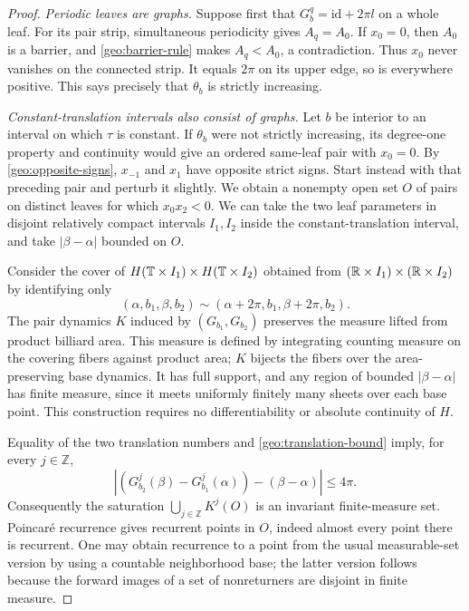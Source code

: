 \begin{proof}
\emph{Periodic leaves are graphs.}
Suppose first that $G_b^q=\mathrm{id}+2\pi l$ on a whole leaf.
For its pair strip, simultaneous periodicity gives $A_q=A_0$.
If $x_0=0$, then $A_0$ is a barrier, and
\eqref{geo:barrier-rule} makes $A_q<A_0$, a contradiction.
Thus $x_0$ never vanishes on the connected strip.  It equals $2\pi$
on its upper edge, so is everywhere positive.  This says precisely
that $\theta_b$ is strictly increasing.

\emph{Constant-translation intervals also consist of graphs.}
Let $b$ be interior to an interval on which $\tau$ is constant.
If $\theta_b$ were not strictly increasing, its degree-one property
and continuity would give an ordered same-leaf pair with $x_0=0$.
By \eqref{geo:opposite-signs}, $x_{-1}$ and $x_1$ have opposite strict
signs.  Start instead with that preceding pair and perturb it slightly.
We obtain a nonempty open set $O$ of pairs on distinct leaves for which
$x_0x_2<0$.  We can take the two leaf parameters in disjoint relatively
compact intervals $I_1,I_2$ inside the constant-translation interval,
and take $|\beta-\alpha|$ bounded on $O$.

Consider the cover of
$H(\mathbb{T}\times I_1)\times H(\mathbb{T}\times I_2)$ obtained from
$(\mathbb{R}\times I_1)\times(\mathbb{R}\times I_2)$ by identifying only
\[
 (\alpha,b_1,\beta,b_2)
       \sim(\alpha+2\pi,b_1,\beta+2\pi,b_2).
\]
The pair dynamics $K$ induced by $(G_{b_1},G_{b_2})$ preserves the
measure lifted from product billiard area.  This measure is defined by
integrating counting measure on the covering fibers against product
area; $K$ bijects the fibers over the area-preserving base dynamics.
It has full support, and any region of bounded $|\beta-\alpha|$ has
finite measure, since it meets uniformly finitely many sheets over
each base point.  This construction requires no differentiability or
absolute continuity of $H$.

Equality of the two translation numbers and
\eqref{geo:translation-bound} imply, for every $j\in\mathbb Z$,
\begin{equation}\label{geo:relative-bound}
 \left|(G_{b_2}^j(\beta)-G_{b_1}^j(\alpha))
                         -(\beta-\alpha)\right|\le4\pi.
\end{equation}
Consequently the saturation $\bigcup_{j\in\mathbb Z}K^j(O)$ is an
invariant finite-measure set.  Poincar\'e recurrence gives recurrent
points in $O$, indeed almost every point there is recurrent.  One may
obtain recurrence to a point from the usual measurable-set version by
using a countable neighborhood base; the latter version follows because
the forward images of a set of nonreturners are disjoint in finite
measure.


\end{proof}
